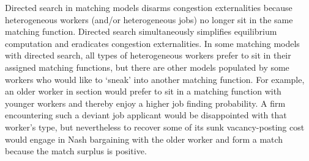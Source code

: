 Directed search in matching models disarms
congestion externalities because heterogeneous workers (and/or
heterogeneous jobs) no longer sit in the same matching
function. Directed search simultaneously simplifies  equilibrium computation and eradicates congestion
externalities.
In some matching models with directed search, all types of
heterogeneous workers
prefer to sit in their assigned
matching functions, but there are other  models populated by some  workers
who would like  to `sneak' into another matching
function. For example, an older worker in section  would  prefer
to sit in a matching function with younger workers and thereby enjoy a higher
job finding probability. A firm encountering such a deviant
job applicant would be disappointed with that worker's type, but nevertheless  to recover some of  its sunk vacancy-posting cost   would  engage in Nash bargaining with the older worker and
form a match because the match surplus is positive.


